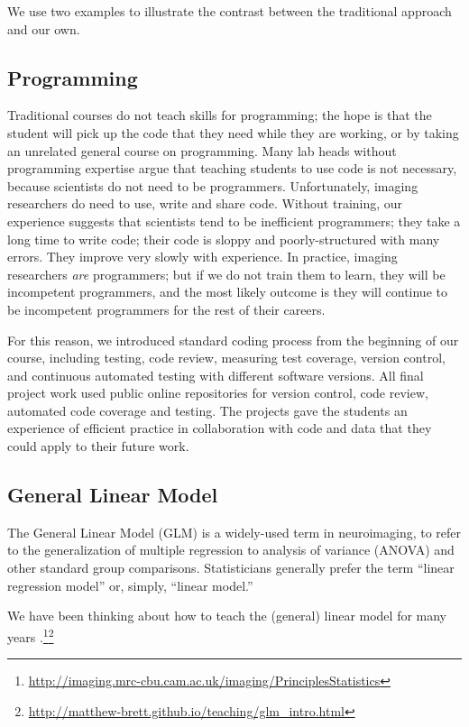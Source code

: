 We use two examples to illustrate the contrast between the
traditional approach and our own.

\subsection{Programming}

Traditional courses do not teach skills for programming; the hope is that the
student will pick up the code that they need while they are working, or by
taking an unrelated general course on programming.  Many lab heads without
programming expertise argue that teaching students to use code is not
necessary, because scientists do not need to be programmers.  Unfortunately,
imaging researchers do need to use, write and share code.  Without training,
our experience suggests that scientists tend to be inefficient programmers;
they take a long time to write code; their code is sloppy and
poorly-structured with many errors.  They improve very slowly with experience.
In practice, imaging researchers {\em are} programmers; but if we do not train
them to learn, they will be incompetent programmers, and the most likely
outcome is they will continue to be incompetent programmers for the rest of
their careers.

For this reason, we introduced standard coding process from the beginning of
our course, including testing, code review, measuring test coverage, version
control, and continuous automated testing with different software versions.
All final project work used public online repositories for version control,
code review, automated code coverage and testing.  The projects gave the
students an experience of efficient practice in collaboration with code and
data that they could apply to their future work.

\subsection{General Linear Model}

The General Linear Model (GLM) is a widely-used term in neuroimaging, to refer
to the generalization of multiple regression to analysis of variance (ANOVA)
and other standard group comparisons.  Statisticians generally prefer the term
``linear regression model'' or, simply, ``linear model.''

We have been thinking about how to teach the (general) linear model for many
years
\citep{poline2012general}.\footnote{\url{http://imaging.mrc-cbu.cam.ac.uk/imaging/PrinciplesStatistics}}\footnote{\label{glm_intro}
\url{http://matthew-brett.github.io/teaching/glm_intro.html}}

